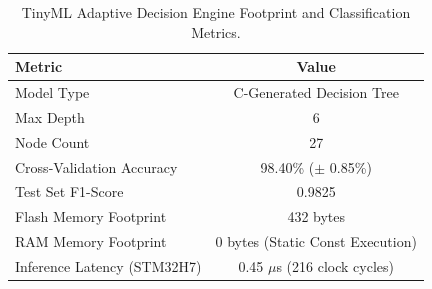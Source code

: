 \begin{table}[t]
\centering
\caption{TinyML Adaptive Decision Engine Footprint and Classification Metrics.}
\label{tab:tinyml_metrics}
\begin{tabular}{lc}
\hline
\textbf{Metric} & \textbf{Value} \\
\hline
Model Type              & C-Generated Decision Tree \\
Max Depth               & 6 \\
Node Count              & 27 \\
Cross-Validation Accuracy & 98.40\% ($\pm$ 0.85\%) \\
Test Set F1-Score       & 0.9825 \\
Flash Memory Footprint  & 432 bytes \\
RAM Memory Footprint    & 0 bytes (Static Const Execution) \\
Inference Latency (STM32H7) & 0.45 $\mu$s (216 clock cycles) \\
\hline
\end{tabular}
\end{table}

